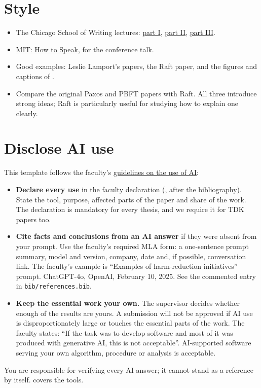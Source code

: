 \section{Style}
\begin{itemize}
  \item The Chicago School of Writing lectures: \href{https://www.youtube.com/watch?v=vtIzMaLkCaM}{part I}, \href{https://www.youtube.com/watch?v=aFwVf5a3pZM}{part II}, \href{https://www.youtube.com/watch?v=gphdfSwYMWU}{part III}.
  \item \href{https://www.youtube.com/watch?v=Unzc731iCUY}{MIT: How to Speak}, for the conference talk.
  \item Good examples: Leslie Lamport's papers, the Raft paper, and the figures and captions of \citet{guide:gulyas2015navigable}.
  \item Compare the original Paxos and PBFT papers with Raft. All three introduce strong ideas; Raft is particularly useful for studying how to explain one clearly.
\end{itemize}

\section{Disclose AI use}\label{app:writing:ai}
This template follows the faculty's \href{https://vik.bme.hu/page/1346/}{guidelines on the use of AI}:
\begin{itemize}
  \item \textbf{Declare every use} in the faculty declaration (, after the bibliography). State the tool, purpose, affected parts of the paper and share of the work. The declaration is mandatory for every thesis, and we require it for TDK papers too.
  \item \textbf{Cite facts and conclusions from an AI answer} if they were absent from your prompt. Use the faculty's required MLA form: a one-sentence prompt summary, model and version, company, date and, if possible, conversation link. The faculty's example is \enquote{Examples of harm-reduction initiatives} prompt. ChatGPT-4o, OpenAI, February 10, 2025. See the commented entry in \texttt{bib/references.bib}.
\end{itemize}
\begin{itemize}
  \item \textbf{Keep the essential work your own.} The supervisor decides whether enough of the results are yours. A submission will not be approved if AI use is disproportionately large or touches the essential parts of the work. The faculty states: \enquote{If the task was to develop software and most of it was produced with generative AI, this is not acceptable}. AI-supported software serving your own algorithm, procedure or analysis is acceptable.
\end{itemize}
You are responsible for verifying every AI answer; it cannot stand as a reference by itself.  covers the tools.
